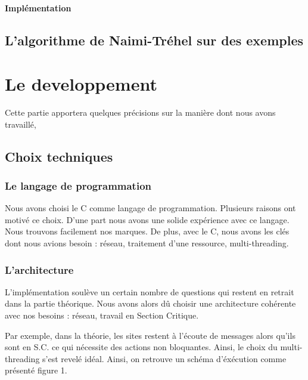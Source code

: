 \documentclass[a4paper,12pt]{article}
\newcommand{\nt}{Naimi-Tréhel }
\begin{document}
\paragraph{Implémentation}

\subsection{L'algorithme de \nt sur des exemples}


\section{Le developpement}

Cette partie apportera quelques précisions sur la manière dont nous avons travaillé, 

\subsection{Choix techniques}
\subsubsection{Le langage de programmation}
Nous avons choisi le C comme langage de programmation. Plusieurs raisons ont motivé ce choix. 
D'une part nous avons une solide expérience avec ce langage. Nous trouvons facilement nos marques.
De plus, avec le C, nous avons les clés dont nous avions besoin : réseau, traitement d'une ressource, multi-threading.

\subsubsection{L'architecture}

L'implémentation soulève un certain nombre de questions qui restent en retrait dans la partie théorique. Nous avons alors dû choisir une architecture cohérente avec nos besoins : réseau, travail en Section Critique.

Par exemple, dans la théorie, les sites restent à l'écoute de messages alors qu'ils sont en S.C. ce qui nécessite des actions non bloquantes. Ainsi, le choix du multi-threading s'est revelé idéal.
Ainsi, on retrouve un schéma d'éxécution comme présenté figure 1.
\end{document}
